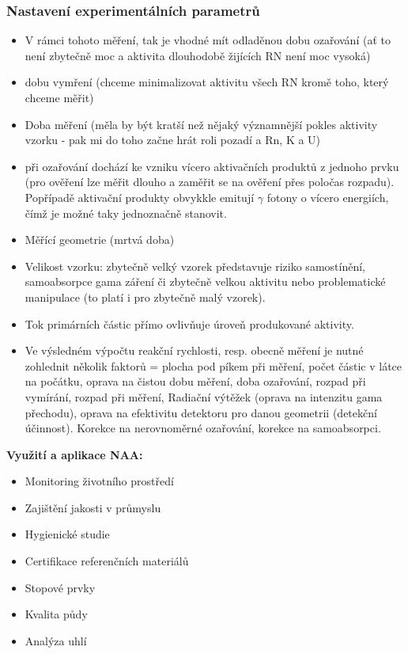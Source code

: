 \subsubsection{Nastavení experimentálních parametrů}
\begin{itemize}

            \item V rámci tohoto měření, tak je vhodné mít odladěnou dobu ozařování (ať to není zbytečně moc a aktivita dlouhodobě žijících RN není moc vysoká)
            \item dobu vymření (chceme minimalizovat aktivitu všech RN kromě toho, který chceme měřit)
            \item Doba měření (měla by být kratší než nějaký významnější pokles aktivity vzorku - pak mi do toho začne hrát roli pozadí a Rn, K a U)
            \item při ozařování dochází ke vzniku vícero aktivačních produktů z jednoho prvku (pro ověření lze měřit dlouho a zaměřit se na ověření přes poločas rozpadu). Popřípadě aktivační produkty obvykkle emitují $\gamma$ fotony o vícero energiích, čímž je možné taky jednoznačně stanovit.
            \item Měřící geometrie (mrtvá doba)
            \item Velikost vzorku: zbytečně velký vzorek představuje riziko samostínění, samoabsorpce gama záření či zbytečně velkou aktivitu nebo problematické manipulace (to platí i pro zbytečně malý vzorek).
            \item Tok primárních částic přímo ovlivňuje úroveň produkované aktivity.
            \item Ve výsledném výpočtu reakční rychlosti, resp. obecně měření je nutné zohlednit několik faktorů = plocha pod píkem při měření, počet částic v látce na počátku, oprava na čistou dobu měření, doba ozařování, rozpad při vymírání, rozpad při měření, Radiační výtěžek (oprava na intenzitu gama přechodu), oprava na efektivitu detektoru pro danou geometrii (detekční účinnost). Korekce na nerovnoměrné ozařování, korekce na samoabsorpci.
        \end{itemize}

\textbf{Využití a aplikace NAA:}
\begin{itemize}
    \item Monitoring životního prostředí
    \item Zajištění jakosti v průmyslu
    \item Hygienické studie
    \item Certifikace referenčních materiálů
    \item Stopové prvky
    \item Kvalita půdy
    \item Analýza uhlí
\end{itemize}